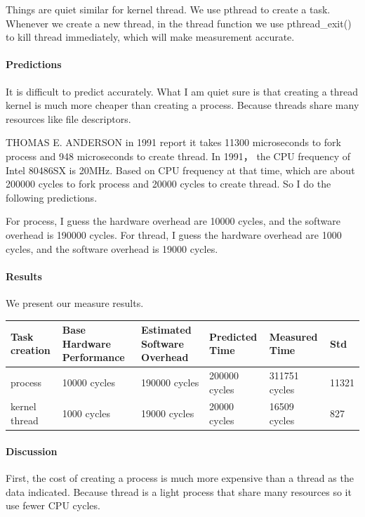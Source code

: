 Things are quiet similar for kernel thread. We use pthread to create a task. Whenever we create a new thread, in the thread function we use pthread\_exit() to kill thread immediately, which will make measurement accurate.

\paragraph{Predictions}
It is difficult to predict accurately. What I am quiet sure is that creating a thread kernel is much more cheaper than creating a process. Because threads share many resources like file descriptors.

THOMAS E. ANDERSON in 1991 report it takes 11300 microseconds to fork process and 948 microseconds to create thread. \cite{task} In 1991， the CPU frequency of Intel 80486SX is 20MHz. Based on CPU frequency at that time, which are about 200000 cycles to fork process and 20000 cycles to create thread. So I do the following predictions.

For process, I guess the hardware overhead are 10000 cycles, and the software overhead is 190000 cycles.
For thread, I guess the hardware overhead are 1000 cycles, and the software overhead is 19000 cycles.

\paragraph{Results}
We present our measure results.

\begin{center}
\begin{tabular}{| p{2cm} | p{3cm} | p{3cm} | p{2.5cm} | p{2.5cm} | p{2cm} }
Task creation  & Base Hardware Performance  & Estimated Software Overhead  & Predicted Time  & Measured Time  & Std \\
\hline
process & 10000 cycles& 190000 cycles& 200000 cycles& 311751  cycles & 11321 \\
kernel thread    & 1000 cycles& 19000 cycles& 20000 cycles& 16509 cycles & 827\\
\end{tabular}
\end{center}

\paragraph{Discussion}
First, the cost of creating a process is much more expensive than a thread as the data indicated. Because thread is a light process that share many resources so it use fewer CPU cycles.

